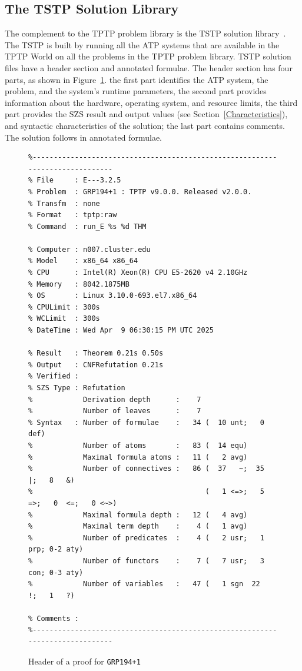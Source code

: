 \documentclass[runningheads]{llncs}
\begin{document}
\subsection{The TSTP Solution Library}
\label{TSTP}

The complement to the TPTP problem library is the TSTP solution library~\cite{Sut07-CSR,Sut10}.
The TSTP is built by running all the ATP systems that are available in the TPTP World on
all the problems in the TPTP problem library.
TSTP solution files have a header section and annotated formulae.
The header section has four parts, as shown in Figure~\ref{ExampleDerivationHeader}.
the first part identifies the ATP system, the problem, and the system's runtime parameters,
the second part provides information about the hardware, operating system, and resource limits,
the third part provides the SZS result and output values (see Section~\ref{Characteristics}), 
and syntactic characteristics of the solution; the last part contains comments.
The solution follows in annotated formulae.

\begin{figure}[htb]
\centering
{\scriptsize
{\setlength{\baselineskip}{2.5mm}
\begin{verbatim}
%------------------------------------------------------------------------------
% File     : E---3.2.5
% Problem  : GRP194+1 : TPTP v9.0.0. Released v2.0.0.
% Transfm  : none
% Format   : tptp:raw
% Command  : run_E %s %d THM

% Computer : n007.cluster.edu
% Model    : x86_64 x86_64
% CPU      : Intel(R) Xeon(R) CPU E5-2620 v4 2.10GHz
% Memory   : 8042.1875MB
% OS       : Linux 3.10.0-693.el7.x86_64
% CPULimit : 300s
% WCLimit  : 300s
% DateTime : Wed Apr  9 06:30:15 PM UTC 2025

% Result   : Theorem 0.21s 0.50s
% Output   : CNFRefutation 0.21s
% Verified : 
% SZS Type : Refutation
%            Derivation depth      :    7
%            Number of leaves      :    7
% Syntax   : Number of formulae    :   34 (  10 unt;   0 def)
%            Number of atoms       :   83 (  14 equ)
%            Maximal formula atoms :   11 (   2 avg)
%            Number of connectives :   86 (  37   ~;  35   |;   8   &)
%                                         (   1 <=>;   5  =>;   0  <=;   0 <~>)
%            Maximal formula depth :   12 (   4 avg)
%            Maximal term depth    :    4 (   1 avg)
%            Number of predicates  :    4 (   2 usr;   1 prp; 0-2 aty)
%            Number of functors    :    7 (   7 usr;   3 con; 0-3 aty)
%            Number of variables   :   47 (   1 sgn  22   !;   1   ?)

% Comments : 
%------------------------------------------------------------------------------
\end{verbatim}
}}
\caption{Header of a proof for {\tt GRP194+1}}
\label{ExampleDerivationHeader}
\end{figure}
\end{document}
